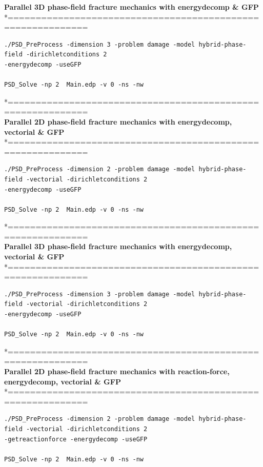 \textbf{ Parallel 3D phase-field fracture mechanics with energydecomp \& GFP} \\
*============================================================\\
\begin{lstlisting}[style=Linux]
./PSD_PreProcess -dimension 3 -problem damage -model hybrid-phase-field -dirichletconditions 2
-energydecomp -useGFP   

PSD_Solve -np 2  Main.edp -v 0 -ns -nw   	
\end{lstlisting}
*============================================================\\
 \textbf{Parallel 2D phase-field fracture mechanics with energydecomp, vectorial \& GFP} \\
*============================================================\\
\begin{lstlisting}[style=Linux]
./PSD_PreProcess -dimension 2 -problem damage -model hybrid-phase-field -vectorial -dirichletconditions 2 
-energydecomp -useGFP  

PSD_Solve -np 2  Main.edp -v 0 -ns -nw   
\end{lstlisting}
*============================================================\\
\textbf{ Parallel 3D phase-field fracture mechanics with energydecomp, vectorial \& GFP} \\
*============================================================\\
\begin{lstlisting}[style=Linux]
./PSD_PreProcess -dimension 3 -problem damage -model hybrid-phase-field -vectorial -dirichletconditions 2
-energydecomp -useGFP   

PSD_Solve -np 2  Main.edp -v 0 -ns -nw   	
\end{lstlisting}
*============================================================\\
 \textbf{Parallel 2D phase-field fracture mechanics with reaction-force, energydecomp, vectorial \& GFP} \\
*============================================================\\
\begin{lstlisting}[style=Linux]
./PSD_PreProcess -dimension 2 -problem damage -model hybrid-phase-field -vectorial -dirichletconditions 2 
-getreactionforce -energydecomp -useGFP  

PSD_Solve -np 2  Main.edp -v 0 -ns -nw   
\end{lstlisting}
